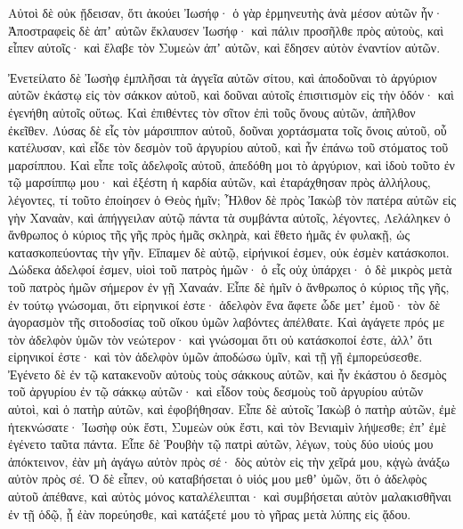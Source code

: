 {Αὐτοὶ δὲ οὐκ ᾔδεισαν, ὅτι ἀκούει Ἰωσήφ· ὁ γὰρ ἑρμηνευτὴς ἀνὰ μέσον αὐτῶν ἦν·
Ἀποστραφεὶς δὲ ἀπʼ αὐτῶν ἔκλαυσεν Ἰωσήφ· καὶ πάλιν προσῆλθε πρὸς αὐτοὺς, καὶ εἶπεν αὐτοῖς· καὶ ἔλαβε τὸν Συμεὼν ἀπʼ αὐτῶν, καὶ ἔδησεν αὐτὸν ἐναντίον αὐτῶν.
\par }{\PP {}Ἐνετείλατο δὲ Ἰωσὴφ ἐμπλῆσαι τὰ ἀγγεῖα αὐτῶν σίτου, καὶ ἀποδοῦναι τὸ ἀργύριον αὐτῶν ἑκάστῳ εἰς τὸν σάκκον αὐτοῦ, καὶ δοῦναι αὐτοῖς ἐπισιτισμὸν εἰς τὴν ὁδόν· καὶ ἐγενήθη αὐτοῖς οὕτως.
Καὶ ἐπιθέντες τὸν σῖτον ἐπὶ τοῦς ὄνους αὐτῶν, ἀπῆλθον ἐκεῖθεν.
Λύσας δὲ εἷς τὸν μάρσιππον αὐτοῦ, δοῦναι χορτάσματα τοῖς ὄνοις αὐτοῦ, οὗ κατέλυσαν, καὶ εἶδε τὸν δεσμὸν τοῦ ἀργυρίου αὐτοῦ, καὶ ἦν ἐπάνω τοῦ στόματος τοῦ μαρσίππου.
Καὶ εἶπε τοῖς ἀδελφοῖς αὐτοῦ, ἀπεδόθη μοι τὸ ἀργύριον, καὶ ἰδοὺ τοῦτο ἐν τῷ μαρσίππῳ μου· καὶ ἐξέστη ἡ καρδία αὐτῶν, καὶ ἐταράχθησαν πρὸς ἀλλήλους, λέγοντες, τί τοῦτο ἐποίησεν ὁ Θεὸς ἡμῖν;
Ἦλθον δὲ πρὸς Ἰακὼβ τὸν πατέρα αὐτῶν εἰς γὴν Χαναὰν, καὶ ἀπήγγειλαν αὐτῷ πάντα τὰ συμβάντα αὐτοῖς, λέγοντες,
Λελάληκεν ὁ ἄνθρωπος ὁ κύριος τῆς γῆς πρὸς ἡμᾶς σκληρὰ, καὶ ἔθετο ἡμᾶς ἐν φυλακῇ, ὡς κατασκοπεύοντας τὴν γῆν.
Εἴπαμεν δὲ αὐτῷ, εἰρήνικοί ἐσμεν, οὐκ ἐσμὲν κατάσκοποι.
Δώδεκα ἀδελφοί ἐσμεν, υἱοὶ τοῦ πατρὸς ἡμῶν· ὁ εἷς οὐχ ὑπάρχει· ὁ δὲ μικρὸς μετὰ τοῦ πατρὸς ἡμῶν σήμερον ἐν γῇ Χαναάν.
Εἶπε δὲ ἡμῖν ὁ ἄνθρωπος ὁ κύριος τῆς γῆς, ἐν τούτῳ γνώσομαι, ὅτι εἰρηνικοί ἐστε· ἀδελφὸν ἕνα ἄφετε ὧδε μετʼ ἐμοῦ· τὸν δὲ ἀγορασμὸν τῆς σιτοδοσίας τοῦ οἴκου ὑμῶν λαβόντες ἀπέλθατε.
Καὶ ἀγάγετε πρός με τὸν ἀδελφὸν ὑμῶν τὸν νεώτερον· καὶ γνώσομαι ὅτι οὐ κατάσκοποί ἐστε, ἀλλʼ ὅτι εἰρηνικοί ἐστε· καὶ τὸν ἀδελφὸν ὑμῶν ἀποδώσω ὑμῖν, καὶ τῇ γῇ ἐμπορεύσεσθε.
Ἐγένετο δὲ ἐν τῷ κατακενοῦν αὐτοὺς τοὺς σάκκους αὐτῶν, καὶ ἦν ἑκάστου ὁ δεσμὸς τοῦ ἀργυρίου ἐν τῷ σάκκῳ αὐτῶν· καὶ εἶδον τοὺς δεσμοὺς τοῦ ἀργυρίου αὐτῶν αὐτοὶ, καὶ ὁ πατὴρ αὐτῶν, καὶ ἐφοβήθησαν.
Εἶπε δὲ αὐτοῖς Ἰακὼβ ὁ πατὴρ αὐτῶν, ἐμὲ ἠτεκνώσατε· Ἰωσὴφ οὐκ ἔστι, Συμεὼν οὐκ ἔστι, καὶ τὸν Βενιαμὶν λήψεσθε; ἐπʼ ἐμὲ ἐγένετο ταῦτα πάντα.
Εἶπε δὲ Ῥουβὴν τῷ πατρὶ αὐτῶν, λέγων, τοὺς δύο υἱούς μου ἀπόκτεινον, ἐὰν μὴ ἀγάγω αὐτὸν πρὸς σέ· δὸς αὐτὸν εἰς τὴν χεῖρά μου, κᾀγὼ ἀνάξω αὐτὸν πρὸς σέ.
Ὁ δὲ εἶπεν, οὐ καταβήσεται ὁ υἱός μου μεθʼ ὑμῶν, ὅτι ὁ ἀδελφὸς αὐτοῦ ἀπέθανε, καὶ αὐτὸς μόνος καταλέλειπται· καὶ συμβήσεται αὐτὸν μαλακισθῆναι ἐν τῇ ὁδῷ, ᾗ ἐὰν πορεύησθε, καὶ κατάξετέ μου τὸ γῆρας μετὰ λύπης εἰς ᾅδου.

}
